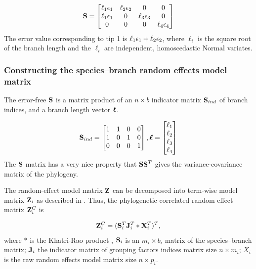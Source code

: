 \begin{align*}
{\mathbf S} = \begin{bmatrix}
\ell_1 { \epsilon}_1 & \ell_2 { \epsilon}_2 & 0 & 0 \\
\ell_1 { \epsilon}_1 &  0 & \ell_3 { \epsilon}_3 & 0 \\
0  &  0 & 0  & \ell_4 { \epsilon}_4
\end{bmatrix}
\end{align*}
The error value corresponding to tip 1 is $\ell_1 { \epsilon}_1 + \ell_2 { \epsilon}_2$, where $\ell_i$ is the square root of the branch length and the $\ell_i$ are independent, homoscedastic Normal variates. 


\subsubsection*{Constructing the species--branch random effects model matrix}

The error-free ${\mathbf S}$ is a matrix product of an $n \times b$ indicator matrix ${\mathbf S}_{ind}$ of branch indices, and a branch length vector ${\boldsymbol \ell}$.

\begin{align}
{\mathbf S}_{ind} = \begin{bmatrix}
1 & 1 & 0 & 0 \\ 
1 & 0 & 1 & 0 \\ 
0 & 0 & 0 & 1
\end{bmatrix} , 
{\boldsymbol \ell} = \begin{bmatrix}
\ell_1 \\
\ell_2 \\
\ell_3 \\
\ell_4 
\end{bmatrix}
\label{eq:S}
\end{align}
The ${\mathbf S}$ matrix has a very nice property that ${\mathbf S} {\mathbf S}^T$ gives the variance-covariance matrix of the phylogeny. 

The random-effect model matrix ${\mathbf Z}$ can be decomposed into term-wise model matrix ${\mathbf Z}_{i}$ as described in \citet{bates2015fitting}.
Thus, the phylogenetic correlated random-effect matrix ${\mathbf Z}^{C}_{i}$ is

\begin{equation}
{\mathbf Z}^{C}_{i} = ({\mathbf S}^{T}_{i}{\mathbf J}^{T}_{i} \ast {\mathbf X}^{T}_{i})^{T}, \label{eq:ZC}
\end{equation}
where $\ast$ is the Khatri-Rao product \citep{khatri1968solutions}, ${\mathbf S}_{i}$ is an $m_{i} \times b_{i}$ matrix of the species--branch matrix; ${\mathbf J}_{i}$ the indicator matrix of grouping factors indices matrix size $n \times m_{i}$; $X_{i}$ is the raw random effects model matrix size $n \times p_{i}$. 


